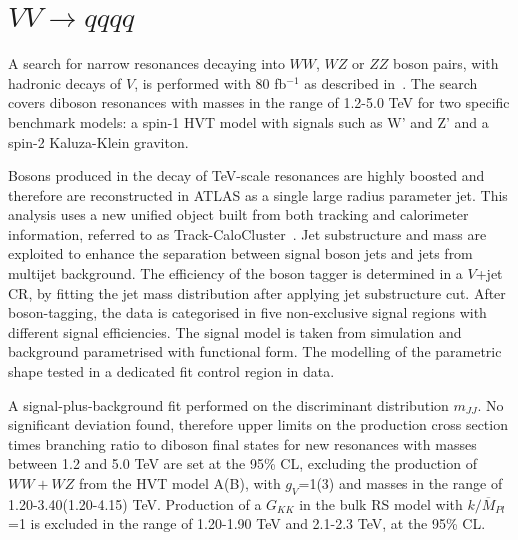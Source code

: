 \documentclass{PoS}
\begin{document}
\section{$VV\rightarrow qqqq$}
\label{sec:VV}
A search for narrow resonances decaying into $WW$, $WZ$ or $ZZ$ boson pairs, with hadronic decays of $V$, is performed with 80 fb$^{-1}$ as described in~\cite{ATLAS-CONF-2018-016}. The search covers diboson resonances with masses in the range of 1.2-5.0 TeV for two specific benchmark models: a spin-1 HVT model with signals such as W' and Z' and a spin-2 Kaluza-Klein graviton.

Bosons produced in the decay of TeV-scale resonances are highly boosted and therefore are reconstructed in ATLAS as a single large radius parameter jet. 
This analysis uses a new unified object built from both tracking and calorimeter information, referred to as Track-CaloCluster~\cite{ATL-PHYS-PUB-2017-015}. 
Jet substructure and mass are exploited to enhance the separation between signal boson jets and jets from multijet background. 
The efficiency of the boson tagger is determined in a $V$+jet CR, by fitting the jet mass distribution after applying jet substructure cut. %
After boson-tagging, the data is categorised in five non-exclusive signal regions with different signal efficiencies.
The signal model is taken from simulation and background parametrised with functional form. 
The modelling of the parametric shape tested in a dedicated fit control region in data.

A signal-plus-background fit performed on the discriminant distribution $m_{JJ}$.
No significant deviation found, therefore upper limits on the production cross section times branching ratio to diboson final states for new resonances with masses between 1.2 and 5.0 TeV are set at the 95\% CL, excluding the production of $WW+WZ$ from the HVT model A(B), with $g_V$=1(3) and masses in the range of 1.20-3.40(1.20-4.15) TeV. 
Production of a $G_{KK}$ in the bulk RS model with $k/\overline{M}_{Pl}$=1 is excluded in the range of 1.20-1.90 TeV and 2.1-2.3 TeV, at the 95\% CL.
\end{document}
